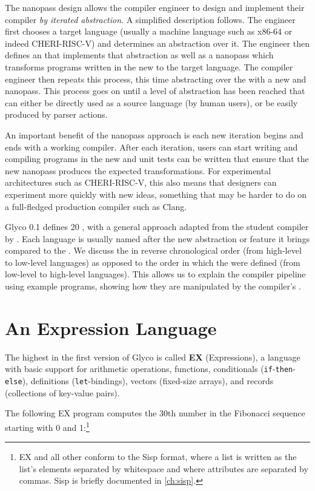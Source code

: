 \documentclass[main.tex]{subfiles}
\begin{document}
The nanopass design allows the compiler engineer to design and implement their compiler \emph{by iterated abstraction}. A simplified description follows. The engineer first chooses a target language (usually a machine language such as x86-64 or indeed CHERI-RISC-V) and determines an abstraction over it. The engineer then defines an  that implements that abstraction as well as a \gls{nanopass} which transforms programs written in the new  to the target language. The compiler engineer then repeats this process, this time abstracting over the  with a new  and \gls{nanopass}. This process goes on until a level of abstraction has been reached that can either be directly used as a source language (by human users), or be easily produced by parser actions.

An important benefit of the nanopass approach is each new iteration begins and ends with a working compiler. After each iteration, users can start writing and compiling programs in the new  and unit tests can be written that ensure that the new \gls{nanopass} produces the expected transformations. For experimental architectures such as CHERI-RISC-V, this also means that designers can experiment more quickly with new ideas, something that may be harder to do on a full-fledged production compiler such as Clang.

Glyco 0.1 defines 20 , with a general approach adapted from the student compiler by \cite{compcourse}. Each language is usually named after the new abstraction or feature it brings compared to the . We discuss the  in reverse chronological order (from high-level to low-level languages) as opposed to the order in which the  were defined (from low-level to high-level languages). This allows us to explain the compiler pipeline using example programs, showing how they are manipulated by the compiler's .

\section{An Expression Language} \label{sct:ex}
The highest  in the first version of Glyco is called \textbf{EX} (Expressions), a language with basic support for arithmetic operations, functions, conditionals (\texttt{if}-\texttt{then}-\texttt{else}), definitions (\texttt{let}-bindings), vectors (fixed-size arrays), and records (collections of key-value pairs).

The following EX program computes the 30th number in the Fibonacci sequence starting with 0 and 1:\footnote{EX and all other  conform to the Sisp format, where a list is written as the list's elements separated by whitespace and where attributes are separated by commas. Sisp is briefly documented in \cref{ch:sisp}.}
\end{document}
